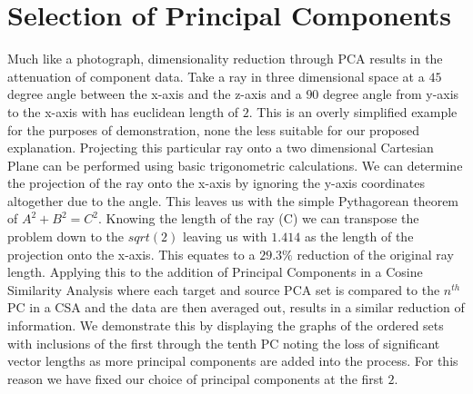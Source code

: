 \documentclass[conference]{IEEEtran}
\begin{document}
\section{Selection of Principal Components}
Much like a photograph, dimensionality reduction through PCA results in the attenuation of component data. Take a ray in three dimensional space at a $45$ degree angle between the x-axis and the z-axis and a $90$ degree angle from y-axis to the x-axis with has euclidean length of $2$.   This is an overly simplified example for the purposes of demonstration, none the less suitable for our proposed explanation. Projecting this particular ray onto a two dimensional Cartesian Plane can be performed using basic trigonometric calculations. We can determine the projection of the ray onto the x-axis by ignoring the y-axis coordinates altogether due to the angle. This leaves us with the simple Pythagorean theorem of $A^2 + B^2 = C^2$. Knowing the length of the ray (C) we can transpose the problem down to the $sqrt(2)$ leaving us with $1.414$ as the length of the projection onto the x-axis. This equates to a $29.3\%$ reduction of the original ray length. Applying this to the addition of Principal Components in a Cosine Similarity Analysis where each target and source PCA set is compared to the $n^{th}$ PC in a CSA and the data are then averaged out, results in a similar reduction of information. We demonstrate this by displaying the graphs of the ordered sets with inclusions of the first through the tenth PC noting the loss of significant vector lengths as more principal components are added into the process. For this reason we have fixed our choice of principal components at the first $2$.
\end{document}
